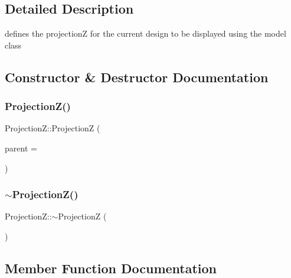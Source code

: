 \subsection{Detailed Description}
defines the projectionZ for the current design to be displayed using the model class 

\subsection{Constructor \& Destructor Documentation}
\mbox{\label{class_projection_z_ac812d46606329365a4e877b6cc58d86d}} 
\subsubsection{\texorpdfstring{Projection\+Z()}{ProjectionZ()}}
{\footnotesize\ttfamily Projection\+Z\+::\+ProjectionZ (\begin{DoxyParamCaption}\item[{Q\+Widget $\ast$}]{parent = {} }\end{DoxyParamCaption})\hspace{0.3cm}{\ttfamily [explicit]}}

\mbox{\label{class_projection_z_a5d1f4701bf63635f88924761f26ce173}} 
\subsubsection{\texorpdfstring{$\sim$\+Projection\+Z()}{~ProjectionZ()}}
{\footnotesize\ttfamily Projection\+Z\+::$\sim$\+ProjectionZ (\begin{DoxyParamCaption}{ }\end{DoxyParamCaption})}



\subsection{Member Function Documentation}
\mbox{\label{class_projection_z_aa470131d521e6595d293e12f0fa3425f}} 
